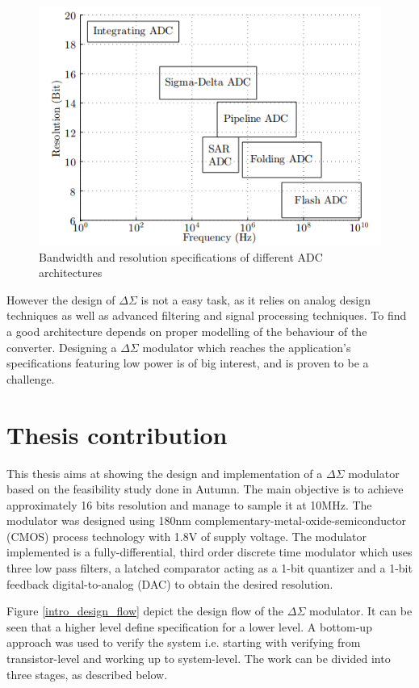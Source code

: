 \begin{figure}[H]
\centering
\includegraphics[scale = 0.7]{images/compare_adc.png}
\caption{Bandwidth and resolution specifications of different ADC architectures}
\label{comp_asdc}
\end{figure}

However the design of $\Delta\Sigma$ is not a easy task, as it relies on analog design techniques as well as advanced filtering and signal  processing techniques. To find a good architecture depends on proper modelling of the behaviour of the converter. Designing a $\Delta\Sigma$ modulator which reaches the application's specifications featuring low power is of big interest, and is proven to be a challenge. 

\section{Thesis contribution}
This thesis aims at showing the design and implementation of a $\Delta\Sigma$ modulator based on the feasibility study done in Autumn. The main objective is to achieve approximately 16 bits resolution and manage to sample it at 10MHz. The modulator was designed using 180nm complementary-metal-oxide-semiconductor (CMOS) process technology with 1.8V of supply voltage. The modulator implemented is a fully-differential, third order discrete time modulator which uses three low pass filters, a latched comparator acting as a 1-bit quantizer and a 1-bit feedback digital-to-analog (DAC) to obtain the desired resolution. 

Figure \ref{intro_design_flow} depict the design flow of the $\Delta\Sigma$ modulator. It can be seen that a higher level define specification for a lower level. A bottom-up approach was used to verify the system i.e. starting with verifying from transistor-level and working up to system-level. The work can be divided into three stages, as described below.  



